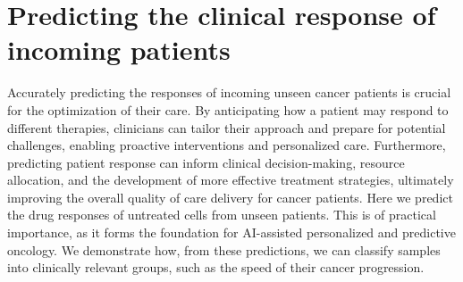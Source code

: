 %
%

\section{Predicting the clinical response of incoming patients}
Accurately predicting the responses of incoming unseen cancer patients is crucial for the optimization of their care.
By anticipating how a patient may respond to different therapies, clinicians can tailor their approach and prepare for potential challenges, enabling proactive interventions and personalized care.
Furthermore, predicting patient response can inform clinical decision-making, resource allocation, and the development of more effective treatment strategies, ultimately improving the overall quality of care delivery for cancer patients.
Here we predict the drug responses of untreated cells from unseen patients.
This is of practical importance, as it forms the foundation for AI-assisted personalized and predictive oncology.
We demonstrate how, from these predictions, we can classify samples into clinically relevant groups, such as the speed of their cancer progression.

